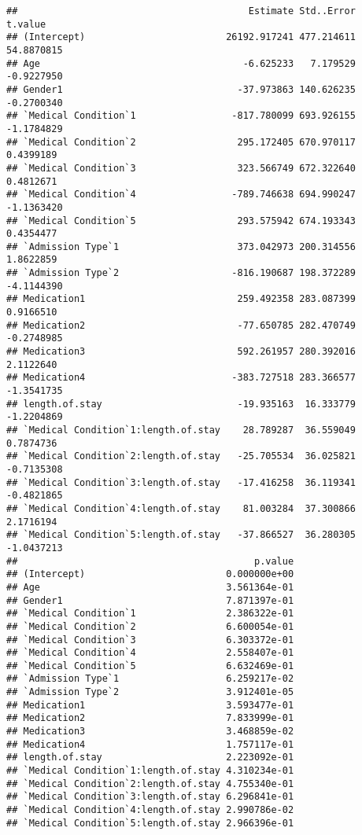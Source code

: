 \documentclass[
]{article}
\begin{document}
\begin{verbatim}
##                                         Estimate Std..Error    t.value
## (Intercept)                         26192.917241 477.214611 54.8870815
## Age                                    -6.625233   7.179529 -0.9227950
## Gender1                               -37.973863 140.626235 -0.2700340
## `Medical Condition`1                 -817.780099 693.926155 -1.1784829
## `Medical Condition`2                  295.172405 670.970117  0.4399189
## `Medical Condition`3                  323.566749 672.322640  0.4812671
## `Medical Condition`4                 -789.746638 694.990247 -1.1363420
## `Medical Condition`5                  293.575942 674.193343  0.4354477
## `Admission Type`1                     373.042973 200.314556  1.8622859
## `Admission Type`2                    -816.190687 198.372289 -4.1144390
## Medication1                           259.492358 283.087399  0.9166510
## Medication2                           -77.650785 282.470749 -0.2748985
## Medication3                           592.261957 280.392016  2.1122640
## Medication4                          -383.727518 283.366577 -1.3541735
## length.of.stay                        -19.935163  16.333779 -1.2204869
## `Medical Condition`1:length.of.stay    28.789287  36.559049  0.7874736
## `Medical Condition`2:length.of.stay   -25.705534  36.025821 -0.7135308
## `Medical Condition`3:length.of.stay   -17.416258  36.119341 -0.4821865
## `Medical Condition`4:length.of.stay    81.003284  37.300866  2.1716194
## `Medical Condition`5:length.of.stay   -37.866527  36.280305 -1.0437213
##                                          p.value
## (Intercept)                         0.000000e+00
## Age                                 3.561364e-01
## Gender1                             7.871397e-01
## `Medical Condition`1                2.386322e-01
## `Medical Condition`2                6.600054e-01
## `Medical Condition`3                6.303372e-01
## `Medical Condition`4                2.558407e-01
## `Medical Condition`5                6.632469e-01
## `Admission Type`1                   6.259217e-02
## `Admission Type`2                   3.912401e-05
## Medication1                         3.593477e-01
## Medication2                         7.833999e-01
## Medication3                         3.468859e-02
## Medication4                         1.757117e-01
## length.of.stay                      2.223092e-01
## `Medical Condition`1:length.of.stay 4.310234e-01
## `Medical Condition`2:length.of.stay 4.755340e-01
## `Medical Condition`3:length.of.stay 6.296841e-01
## `Medical Condition`4:length.of.stay 2.990786e-02
## `Medical Condition`5:length.of.stay 2.966396e-01
\end{verbatim}
\end{document}
